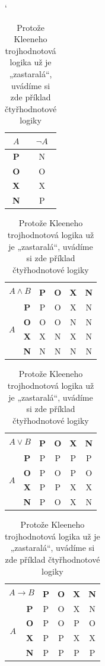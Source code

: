\documentclass[11pt]{article}
\begin{document}
\begin{table}[hb]
    \catcode`
    \centering
    \begin{tabular}{| >{\bfseries}c | c |}
        \hline
         $A$ & $\neg A$ \\\hline
         P & N \\\hline
         O & O \\\hline
         X & X \\\hline
         N & P \\\hline
    \end{tabular}
    \begin{tabular}{|c|>{\bfseries}c|c|c|c|c|}
        \hline
        \multicolumn{2}{|c|}{\multirow{2}{*}{$A \wedge B$}} & \multicolumn{4}{c|}{$B$} \\\cline{3-6}
        \multicolumn{2}{|c|}{} & \textbf{P} & \textbf{O} & \textbf{X} & \textbf{N} \\\hline
        \multirow{4}{*}{$A$} & P & P & O & X & N \\\cline{2-6}
           & O & O & O & N & N \\\cline{2-6}
           & X & X & N & X & N \\\cline{2-6}
           & N & N & N & N & N \\\hline
    \end{tabular}
    \begin{tabular}{|c|>{\bfseries}c|c|c|c|c|}
        \hline
        \multicolumn{2}{|c|}{\multirow{2}{*}{$A \vee B$}} & \multicolumn{4}{c|}{$B$} \\\cline{3-6}
        \multicolumn{2}{|c|}{} & \textbf{P} & \textbf{O} & \textbf{X} & \textbf{N} \\\hline
        \multirow{4}{*}{$A$} & P & P & P & P & P \\\cline{2-6}
           & O & P & O & P & O \\\cline{2-6}
           & X & P & P & X & X \\\cline{2-6}
           & N & P & O & X & N \\\hline
    \end{tabular}
    \begin{tabular}{|c|>{\bfseries}c|c|c|c|c|}
        \hline
        \multicolumn{2}{|c|}{\multirow{2}{*}{$A \rightarrow B$}} & \multicolumn{4}{c|}{$B$} \\\cline{3-6}
        \multicolumn{2}{|c|}{} & \textbf{P} & \textbf{O} & \textbf{X} & \textbf{N} \\\hline
        \multirow{4}{*}{$A$} & P & P & O & X & N \\\cline{2-6}
           & O & P & O & P & O \\\cline{2-6}
           & X & P & P & X & X \\\cline{2-6}
           & N & P & P & P & P \\\hline
    \end{tabular}
    \caption{Protože Kleeneho trojhodnotová logika už je „zastaralá“, uvádíme si zde příklad čtyřhodnotové logiky}
    \label{tab:logika}
\end{table}\pagebreak
\end{document}
